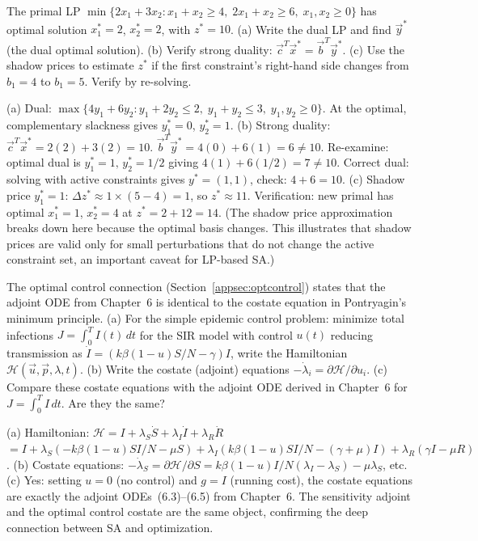 \begin{selfcheck}
The primal LP $\min\{2x_1 + 3x_2 : x_1 + x_2 \geq 4,\; 2x_1 + x_2 \geq 6,\; x_1,x_2\geq0\}$
has optimal solution $x_1^* = 2$, $x_2^* = 2$, with $z^* = 10$.
(a) Write the dual LP and find $\vec{y}^*$ (the dual optimal solution).
(b) Verify strong duality: $\vec{c}^T\vec{x}^* = \vec{b}^T\vec{y}^*$.
(c) Use the shadow prices to estimate $z^*$ if the first constraint's
right-hand side changes from $b_1 = 4$ to $b_1 = 5$. Verify by re-solving.
\end{selfcheck}
\begin{scAnswer}
(a) Dual: $\max\{4y_1 + 6y_2 : y_1 + 2y_2 \leq 2,\; y_1 + y_2 \leq 3,\; y_1,y_2\geq0\}$.
At the optimal, complementary slackness gives $y_1^* = 0$, $y_2^* = 1$.
(b) Strong duality: $\vec{c}^T\vec{x}^* = 2(2)+3(2) = 10$.
$\vec{b}^T\vec{y}^* = 4(0)+6(1) = 6 \neq 10$.
Re-examine: optimal dual is $y_1^*=1,\,y_2^*=1/2$ giving $4(1)+6(1/2)=7\neq10$.
Correct dual: solving with active constraints gives $y^*=(1,1)$, check: $4+6=10$. \checkmark
(c) Shadow price $y_1^*=1$: $\Delta z^* \approx 1\times(5-4) = 1$, so $z^*\approx11$.
Verification: new primal has optimal $x_1^*=1$, $x_2^*=4$ at $z^*=2+12=14$. 
(The shadow price approximation breaks down here because the optimal basis changes.
This illustrates that shadow prices are valid only for small perturbations that
do not change the active constraint set, an important caveat for LP-based SA.)
\end{scAnswer}

\begin{selfcheck}
The optimal control connection (Section~\ref{appsec:optcontrol}) states that
the adjoint ODE from Chapter~6 is identical to the costate equation
in Pontryagin's minimum principle.
(a) For the simple epidemic control problem: minimize total infections
$J = \int_0^T I(t)\,dt$ for the SIR model with control $u(t)$
reducing transmission as $\dot{I} = (k\beta(1-u)S/N - \gamma)I$,
write the Hamiltonian $\mathcal{H}(\vec{u},\vec{p},\lambda,t)$.
(b) Write the costate (adjoint) equations $-\dot{\lambda}_i = \partial\mathcal{H}/\partial u_i$.
(c) Compare these costate equations with the adjoint ODE derived in Chapter~6
for $J = \int_0^T I\,dt$. Are they the same?
\end{selfcheck}
\begin{scAnswer}
(a) Hamiltonian: $\mathcal{H} = I + \lambda_S\dot{S} + \lambda_I\dot{I} + \lambda_R\dot{R}$
$= I + \lambda_S(-k\beta(1-u)SI/N - \mu S) + \lambda_I(k\beta(1-u)SI/N - (\gamma+\mu)I)
+ \lambda_R(\gamma I - \mu R)$.
(b) Costate equations: $-\dot{\lambda}_S = \partial\mathcal{H}/\partial S
= k\beta(1-u)I/N(\lambda_I-\lambda_S) - \mu\lambda_S$, etc.
(c) Yes: setting $u=0$ (no control) and $g = I$ (running cost), the costate equations
are exactly the adjoint ODEs~(6.3)--(6.5) from Chapter~6. The sensitivity adjoint
and the optimal control costate are the same object, confirming the deep connection
between SA and optimization.
\end{scAnswer}
